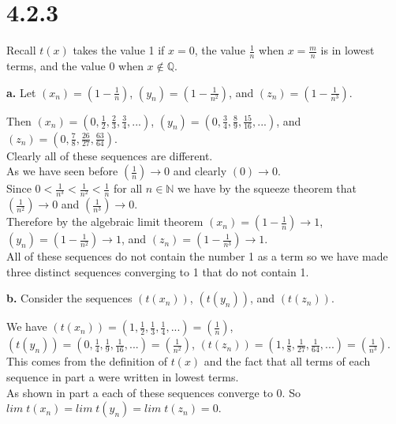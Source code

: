 \documentclass{article}
\begin{document}
\newpage
\section*{4.2.3}
\doublespacing
Recall $t(x)$ takes the value 1 if $x = 0$, the value $\frac{1}{n}$ when $x =\frac{m}{n}$ is in lowest terms, and the value 0 when $x\notin\mathbb{Q}$.

{\Large \textbf{a.}} Let $(x_n) = (1 -\frac{1}{n})$, $(y_n) = (1 -\frac{1}{n^2})$, and $(z_n) = (1 -\frac{1}{n^3})$.
\begin{center}
    \doublespacing
    Then $(x_n) = (0,\frac{1}{2},\frac{2}{3},\frac{3}{4}, ...)$, $(y_n) = (0,\frac{3}{4},\frac{8}{9},\frac{15}{16}, ...)$, and $(z_n) = (0,\frac{7}{8},\frac{26}{27},\frac{63}{64})$.
    \\Clearly all of these sequences are different.
    \\As we have seen before $(\frac{1}{n})\rightarrow 0$ and clearly $(0)\rightarrow 0$.
    \\Since $0 <\frac{1}{n^3} <\frac{1}{n^2} <\frac{1}{n}$ for all $n\in\mathbb{N}$ we have by the squeeze theorem that $(\frac{1}{n^2})\rightarrow 0$ and $(\frac{1}{n^3})\rightarrow 0$.
    \\Therefore by the algebraic limit theorem $(x_n) = (1 -\frac{1}{n})\rightarrow 1$, $(y_n) = (1 -\frac{1}{n^2})\rightarrow 1$, and $(z_n) = (1 -\frac{1}{n^3})\rightarrow 1$.
    \\All of these sequences do not contain the number 1 as a term so we have made three distinct sequences converging to 1 that do not contain 1.
\end{center}

{\Large \textbf{b.}} Consider the sequences $(t(x_n))$, $(t(y_n))$, and $(t(z_n))$.
\begin{center}
    \doublespacing
    We have $(t(x_n)) = (1,\frac{1}{2},\frac{1}{3},\frac{1}{4}, ...) = (\frac{1}{n})$, $(t(y_n)) = (0,\frac{1}{4},\frac{1}{9},\frac{1}{16}, ...) = (\frac{1}{n^2})$, $(t(z_n)) = (1,\frac{1}{8},\frac{1}{27},\frac{1}{64}, ...) = (\frac{1}{n^3})$.
    \\This comes from the definition of $t(x)$ and the fact that all terms of each sequence in part a were written in lowest terms.
    \\As shown in part a each of these sequences converge to 0. So $lim\; t(x_n) = lim\; t(y_n) = lim\; t(z_n) = 0$.
\end{center}
\end{document}
